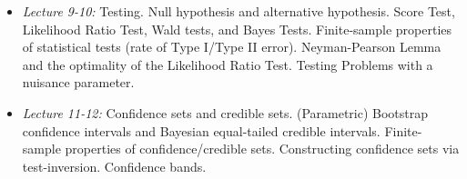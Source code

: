 \documentclass[11pt]{article}
\begin{document}
\begin{enumerate}
\begin{itemize}
\item \emph{Lecture 9-10:} Testing. Null hypothesis and alternative hypothesis. Score Test, Likelihood Ratio Test, Wald tests, and Bayes Tests. Finite-sample properties of statistical tests (rate of Type I/Type II error). Neyman-Pearson Lemma and the optimality of the Likelihood Ratio Test. Testing Problems with a nuisance parameter. \\

\item \emph{Lecture 11-12:} Confidence sets and credible sets. (Parametric) Bootstrap confidence intervals and Bayesian equal-tailed credible intervals. Finite-sample properties of confidence/credible sets. Constructing confidence sets via test-inversion. Confidence bands. 

\end{itemize}

\end{enumerate}

%
%
\end{document}
